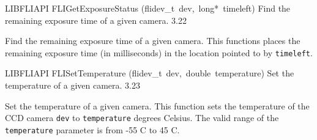 \documentclass{article}
\begin{document}
\begin{cxxentry}
\begin{cxxfunction}
\begin{cxxdoc}
\end{cxxdoc}
\end{cxxfunction}
\begin{cxxfunction}
{LIBFLIAPI}
        {FLIGetExposureStatus}
        {(flidev\_t\ dev,\ long*\ timeleft)}
        { Find the remaining exposure time of a given camera.}
        {3.22}
\begin{cxxdoc}

Find the remaining exposure time of a given camera.  This functions
places the remaining exposure time (in milliseconds) in the
location pointed to by \texttt{timeleft}.


\end{cxxdoc}
\end{cxxfunction}
\begin{cxxfunction}
{LIBFLIAPI}
        {FLISetTemperature}
        {(flidev\_t\ dev,\ double\ temperature)}
        { Set the temperature of a given camera.}
        {3.23}
\begin{cxxdoc}

Set the temperature of a given camera.  This function sets the
temperature of the CCD camera \texttt{dev} to \texttt{temperature}
degrees Celsius.  The valid range of the \texttt{temperature}
parameter is from -55 C to 45 C.



\end{cxxdoc}
\end{cxxfunction}
\end{cxxentry}
\end{document}
